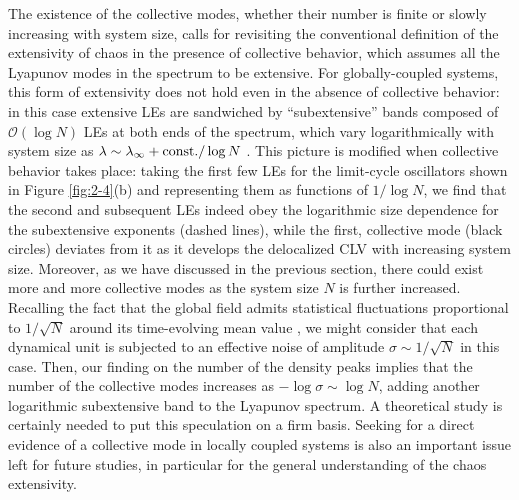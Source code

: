\documentclass[12pt]{iopart}
\begin{document}
The existence of the collective modes,
 whether their number is finite or slowly increasing with system size,
 calls for revisiting the conventional definition of the extensivity of chaos
 in the presence of collective behavior,
 which assumes all the Lyapunov modes in the spectrum to be extensive.
For globally-coupled systems, this form of extensivity
 does not hold even in the absence of collective behavior:
 in this case extensive LEs are sandwiched by ``subextensive'' bands
 composed of $\mathcal{O}(\log N)$ LEs at both ends of the spectrum,
 which vary logarithmically with system size
 as $\lambda \sim \lambda_\infty + \mathrm{const.}/\log N$
 \cite{Takeuchi.etal-PRL2011}.
This picture is modified when collective behavior takes place:
 taking the first few LEs
 for the limit-cycle oscillators shown in Figure \ref{fig:2-4}(b)
 and representing them as functions of $1/\log N$,
 we find that the second and subsequent LEs indeed obey
 the logarithmic size dependence for the subextensive exponents
 (dashed lines),
 while the first, collective mode (black circles) deviates from it
 as it develops the delocalized CLV with increasing system size.
Moreover, as we have discussed in the previous section,
 there could exist more and more collective modes
 as the system size $N$ is further increased.
Recalling the fact that the global field admits
 statistical fluctuations proportional to $1/\sqrt{N}$
 around its time-evolving mean value \cite{Pikovsky.Kurths-PRL1994},
 we might consider that each dynamical unit is subjected to
 an effective noise of amplitude $\sigma \sim 1/\sqrt{N}$ in this case.
Then, our finding on the number of the density peaks implies that
 the number of the collective modes increases as $-\log\sigma \sim \log N$,
 adding another logarithmic subextensive band to the Lyapunov spectrum.
A theoretical study is certainly needed to put
 this speculation on a firm basis.
Seeking for a direct evidence of a collective mode
 in locally coupled systems is also an important issue
 left for future studies, in particular for the general understanding
 of the chaos extensivity.
\end{document}
